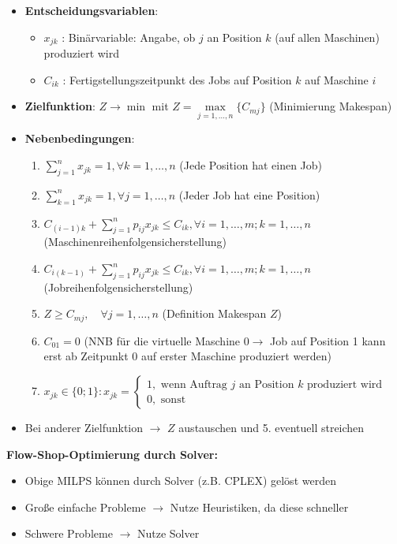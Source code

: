 \begin{itemize}
	\item \textbf{Entscheidungsvariablen}:
	\begin{itemize}
		\item $x_{jk}$ : Binärvariable: Angabe, ob $j$ an Position $k$ (auf allen Maschinen) produziert wird
		\item $C_{ik}$ : Fertigstellungszeitpunkt des Jobs auf Position $k$ auf Maschine $i$
	\end{itemize}
	\item \textbf{Zielfunktion}: $Z \rightarrow \min$ mit $Z=\max\limits_{j=1,\ldots,n}\{C_{mj}\}$ (Minimierung Makespan)
	\item \textbf{Nebenbedingungen}:
	\begin{enumerate}
		\item $\sum\limits_{j=1}^{n} x_{j k}=1, \forall k=1, \ldots, n$ (Jede Position hat einen Job)
		\item $\sum\limits_{k=1}^{n} x_{j k}=1, \forall j=1, \ldots, n$ (Jeder Job hat eine Position)
		\item $C_{(i-1) k}+\sum\limits_{j=1}^{n} p_{i j} x_{j k} \leq C_{i k}, \forall i=1, \ldots, m ; k=1, \ldots, n$ (Maschinenreihenfolgensicherstellung)
		\item $C_{i(k-1)}+\sum\limits_{j=1}^{n} p_{i j} x_{j k} \leq C_{i k}, \forall i=1, \ldots, m ; k=1, \ldots, n$ (Jobreihenfolgensicherstellung)
		\item $Z \geq C_{m j}, \quad \forall j=1, \ldots, n$ (Definition Makespan $Z$)
		\item $C_{01}=0$ (NNB für die virtuelle Maschine $0 \rightarrow$ Job auf Position 1 kann erst ab Zeitpunkt 0 auf erster Maschine produziert werden)
		\item $x_{j k} \in\{0 ; 1\}: x_{j k}=\left\{\begin{array}{l}1, \text { wenn Auftrag } j \text { an Position } k \text { produziert wird } \\ 0, \text { sonst }\end{array}\right.$
	\end{enumerate}
	\item Bei anderer Zielfunktion $\rightarrow$ $Z$ austauschen und 5. eventuell streichen
\end{itemize}
\bigskip
\textbf{Flow-Shop-Optimierung durch Solver:}
\begin{itemize}
	\item Obige MILPS können durch Solver (z.B. CPLEX) gelöst werden
	\item Große einfache Probleme $\rightarrow$ Nutze Heuristiken, da diese schneller
	\item Schwere Probleme $\rightarrow$ Nutze Solver
\end{itemize}